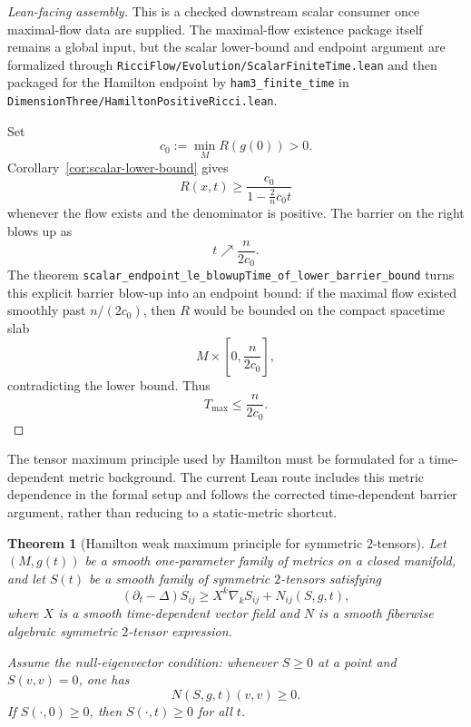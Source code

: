 \documentclass[11pt]{article}
\theoremstyle{plain}
\newtheorem{theorem}{Theorem}[section]
\theoremstyle{definition}
\theoremstyle{remark}
\newcommand{\leanref}[1]{\nolinkurl{#1}}
\newcommand{\leanfile}[1]{\nolinkurl{#1}}
\newcommand{\rffile}[1]{\leanfile{#1}}
\begin{document}
\begin{proof}[Lean-facing assembly]
This is a checked downstream scalar consumer once maximal-flow data are
supplied.  The maximal-flow existence package itself remains a global input,
but the scalar lower-bound and endpoint argument are formalized through
\rffile{RicciFlow/Evolution/ScalarFiniteTime.lean} and then packaged for the
Hamilton endpoint by \leanref{ham3_finite_time} in
\rffile{DimensionThree/HamiltonPositiveRicci.lean}.

Set
\[
  c_0:=\min_M R(g(0))>0.
\]
Corollary~\ref{cor:scalar-lower-bound} gives
\[
  R(x,t)\ge \frac{c_0}{1-\frac2n c_0t}
\]
whenever the flow exists and the denominator is positive.  The barrier on the
right blows up as
\[
  t\nearrow \frac{n}{2c_0}.
\]
The theorem \leanref{scalar_endpoint_le_blowupTime_of_lower_barrier_bound}
turns this explicit barrier blow-up into an endpoint bound: if the maximal flow
existed smoothly past $n/(2c_0)$, then $R$ would be bounded on the compact
spacetime slab
\[
  M\times\left[0,\frac{n}{2c_0}\right],
\]
contradicting the lower bound.  Thus
\[
  T_{\max}\le \frac{n}{2c_0}.
\]
\end{proof}

The tensor maximum principle used by Hamilton must be formulated for a
time-dependent metric background.  The current Lean route includes this
metric dependence in the formal setup and follows the corrected
time-dependent barrier argument, rather than reducing to a static-metric
shortcut.

\begin{theorem}[Hamilton weak maximum principle for symmetric $2$-tensors]
\label{thm:hamilton-tensor-wmp}
Let $(M,g(t))$ be a smooth one-parameter family of metrics on a closed
manifold, and let $S(t)$ be a smooth family of symmetric $2$-tensors satisfying
\[
(\partial_t-\Delta)S_{ij}
\ge
X^k\nabla_kS_{ij}+N_{ij}(S,g,t),
\]
where $X$ is a smooth time-dependent vector field and $N$ is a smooth
fiberwise algebraic symmetric $2$-tensor expression.

Assume the null-eigenvector condition: whenever $S\ge0$ at a point and
$S(v,v)=0$, one has
\[
N(S,g,t)(v,v)\ge0.
\]
If $S(\cdot,0)\ge0$, then $S(\cdot,t)\ge0$ for all $t$.
\end{theorem}
\end{document}
